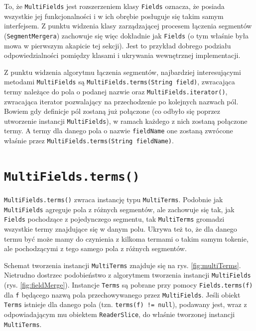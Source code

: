 To, że \texttt{MultiFields} jest rozszerzeniem klasy \texttt{Fields} oznacza, że posiada wszystkie jej funkcjonalności i w ich obrębie posługuje się takim samym interfejsem. Z punktu widzenia klasy zarządzającej procesem łączenia segmentów (\texttt{SegmentMergera}) zachowuje się więc dokładnie jak \texttt{Fields} (o tym właśnie była mowa w pierwszym akapicie tej sekcji). Jest to przykład dobrego podziału odpowiedzialności pomiędzy klasami i ukrywania wewnętrznej implementacji.

Z punktu widzenia algorytmu łączenia segmentów, najbardziej interesującymi metodami \texttt{MultiFields} są \texttt{MultiFields.terms(String field)}, zwracająca termy należące do pola o podanej nazwie oraz \texttt{MultiFields.iterator()}, zwracająca iterator pozwalający na przechodzenie po kolejnych nazwach pól. Bowiem gdy definicje pól zostaną już połączone (co odbyło się poprzez utworzenie instancji \texttt{MultiFields}), w ramach każdego z nich zostaną połączone termy. A termy dla danego pola o nazwie \texttt{fieldName} one zostaną zwrócone właśnie przez \texttt{MultiFields.terms(String fieldName)}.

\section{\texttt{MultiFields.terms()}}

\texttt{MultiFields.terms()} zwraca instancję typu \texttt{MultiTerms}. Podobnie jak \texttt{MultiFields} agreguje pola z różnych segmentów, ale zachowuje się tak, jak \texttt{Fields} pochodzące z pojedynczego segmentu, tak \texttt{MultiTerms}  gromadzi wszystkie termy znajdujące się w danym polu. Ukrywa też to, że dla danego termu być może mamy do czynienia z kilkoma termami o takim samym tokenie, ale pochodzącymi z tego samego pola z różnych segmentów.

Schemat tworzenia instancji \texttt{MultiTerms} znajduje się na rys. \ref{fig:multiTerms}. Nietrudno dostrzec podobieństwo z algorytmem tworzenia instancji \texttt{MultiFields} (rys. \ref{fig:fieldMerge}). Instancje \texttt{Terms} są pobrane przy pomocy \texttt{Fields.terms(f)} dla \texttt{f} będącego nazwą pola przechowywanego przez \texttt{MultiFields}. Jeśli obiekt \texttt{Terms} istnieje dla danego pola (tzn. \texttt{terms(f) != null}), podawany jest, wraz z odpowiadającym mu obiektem \texttt{ReaderSlice}, do właśnie tworzonej instancji \texttt{MultiTerms}.

